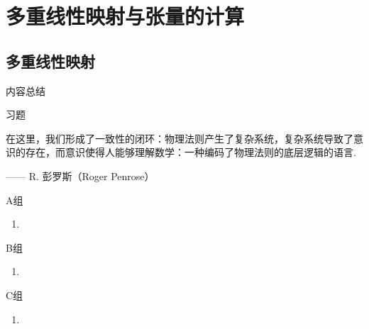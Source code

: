 \chapter{多重线性映射与张量的计算}


\section{多重线性映射}


\vspace{2ex}
\centerline{\heiti \Large 内容总结}


\vspace{2ex}
\centerline{\heiti \Large 习题}

\vspace{2ex}
{\kaishu 在这里，我们形成了一致性的闭环：物理法则产生了复杂系统，复杂系统导致了意识的存在，而意识使得人能够理解数学：一种编码了物理法则的底层逻辑的语言.}
\begin{flushright}
    \kaishu
    —— R. 彭罗斯（Roger Penrose）
\end{flushright}

\centerline{\heiti A组}
\begin{enumerate}
    \item
\end{enumerate}

\centerline{\heiti B组}
\begin{enumerate}
    \item
\end{enumerate}

\centerline{\heiti C组}
\begin{enumerate}
    \item
\end{enumerate}

